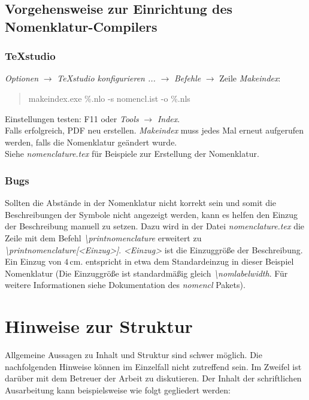 \subsection*{Vorgehensweise zur Einrichtung des Nomenklatur-Compilers}

\subsubsection{TeXstudio}
\textit{Optionen} $\rightarrow$ \textit{TeXstudio konfigurieren ...} $\rightarrow$ \textit{Befehle} $\rightarrow$ Zeile \textit{Makeindex}:
\begin{quotation}
makeindex.exe \%.nlo -s nomencl.ist -o \%.nls 
\end{quotation}

\noindent Einstellungen testen: F11 oder \textit{Tools} $\rightarrow$ \textit{Index}. \\
Falls erfolgreich, PDF neu erstellen. \textit{Makeindex} muss jedes Mal erneut aufgerufen werden, falls die Nomenklatur geändert wurde. \\
Siehe \textit{nomenclature.tex} für Beispiele zur Erstellung der Nomenklatur.

\subsubsection{Bugs}

Sollten die Abstände in der Nomenklatur nicht korrekt sein und somit die Beschreibungen der Symbole nicht angezeigt werden, kann es helfen den Einzug der Beschreibung manuell zu setzen. Dazu wird in der Datei \textit{nomenclature.tex} die Zeile mit dem Befehl \textit{\textbackslash printnomenclature} erweitert zu \textit{\textbackslash printnomenclature[<Einzug>]}. \textit{<Einzug>} ist die Einzuggröße der Beschreibung. Ein Einzug von $4\,\mathrm{cm}$. entspricht in etwa dem Standardeinzug in dieser Beispiel Nomenklatur (Die Einzuggröße ist standardmäßig gleich \textit{\textbackslash nomlabelwidth}. Für weitere Informationen siehe Dokumentation des \textit{nomencl} Pakets). 


\section{Hinweise zur Struktur}
\label{hinweise:struktur}

Allgemeine Aussagen zu Inhalt und Struktur sind schwer möglich. Die nachfolgenden Hinweise können im Einzelfall nicht zutreffend sein. Im Zweifel ist darüber mit dem Betreuer der Arbeit zu diskutieren.
Der Inhalt der schriftlichen Ausarbeitung kann beispielsweise wie
folgt gegliedert werden:

